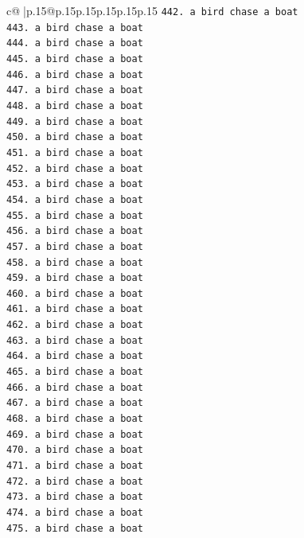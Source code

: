 \documentclass{article}
\begin{document}
{\begin{supertabular}{c@{$\;$}|p{.15\linewidth}@{}p{.15\linewidth}p{.15\linewidth}p{.15\linewidth}p{.15\linewidth}p{.15\linewidth}}
{{{\texttt{442. a bird chase a boat} \\
\texttt{443. a bird chase a boat} \\
\texttt{444. a bird chase a boat} \\
\texttt{445. a bird chase a boat} \\
\texttt{446. a bird chase a boat} \\
\texttt{447. a bird chase a boat} \\
\texttt{448. a bird chase a boat} \\
\texttt{449. a bird chase a boat} \\
\texttt{450. a bird chase a boat} \\
\texttt{451. a bird chase a boat} \\
\texttt{452. a bird chase a boat} \\
\texttt{453. a bird chase a boat} \\
\texttt{454. a bird chase a boat} \\
\texttt{455. a bird chase a boat} \\
\texttt{456. a bird chase a boat} \\
\texttt{457. a bird chase a boat} \\
\texttt{458. a bird chase a boat} \\
\texttt{459. a bird chase a boat} \\
\texttt{460. a bird chase a boat} \\
\texttt{461. a bird chase a boat} \\
\texttt{462. a bird chase a boat} \\
\texttt{463. a bird chase a boat} \\
\texttt{464. a bird chase a boat} \\
\texttt{465. a bird chase a boat} \\
\texttt{466. a bird chase a boat} \\
\texttt{467. a bird chase a boat} \\
\texttt{468. a bird chase a boat} \\
\texttt{469. a bird chase a boat} \\
\texttt{470. a bird chase a boat} \\
\texttt{471. a bird chase a boat} \\
\texttt{472. a bird chase a boat} \\
\texttt{473. a bird chase a boat} \\
\texttt{474. a bird chase a boat} \\
\texttt{475. a bird chase a boat} \\
}}}
\end{supertabular}}
\end{document}
